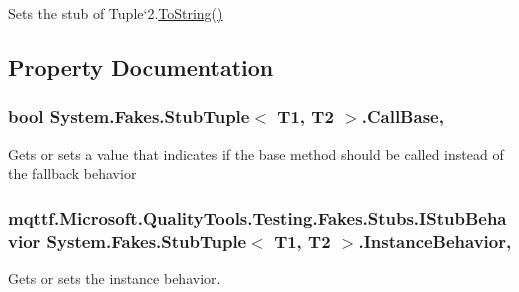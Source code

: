 Sets the stub of Tuple`2.\hyperlink{class_system_1_1_fakes_1_1_stub_tuple_3_01_t1_00_01_t2_01_4_ad032f05310dff24e268b8848adbe8d16}{To\-String()}



\subsection{Property Documentation}
\hypertarget{class_system_1_1_fakes_1_1_stub_tuple_3_01_t1_00_01_t2_01_4_acc6afdff191cae91d04e8813c8882e9a}{
\subsubsection[{Call\-Base}]{\setlength{\rightskip}{0pt plus 5cm}bool System.\-Fakes.\-Stub\-Tuple$<$ T1, T2 $>$.Call\-Base\hspace{0.3cm}{\ttfamily [get]}, {\ttfamily [set]}}}\label{class_system_1_1_fakes_1_1_stub_tuple_3_01_t1_00_01_t2_01_4_acc6afdff191cae91d04e8813c8882e9a}


Gets or sets a value that indicates if the base method should be called instead of the fallback behavior

\hypertarget{class_system_1_1_fakes_1_1_stub_tuple_3_01_t1_00_01_t2_01_4_afce2727f8aacbc9484348757f524cfa9}{
\subsubsection[{Instance\-Behavior}]{\setlength{\rightskip}{0pt plus 5cm}mqttf.\-Microsoft.\-Quality\-Tools.\-Testing.\-Fakes.\-Stubs.\-I\-Stub\-Behavior System.\-Fakes.\-Stub\-Tuple$<$ T1, T2 $>$.Instance\-Behavior\hspace{0.3cm}{\ttfamily [get]}, {\ttfamily [set]}}}\label{class_system_1_1_fakes_1_1_stub_tuple_3_01_t1_00_01_t2_01_4_afce2727f8aacbc9484348757f524cfa9}


Gets or sets the instance behavior.

